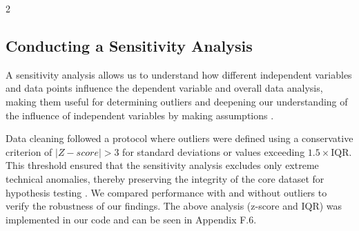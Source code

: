 \documentclass[a4paper,12pt]{article}
\begin{document}
\begin{multicols}{2}

\subsection{Conducting a Sensitivity Analysis} \label{analysis}

A sensitivity analysis allows us to understand how different independent variables and data points influence the dependent variable and overall data analysis, making them useful for determining outliers and deepening our understanding of the influence of independent variables by making assumptions \cite{sensitive}. 

Data cleaning followed a protocol where outliers were defined using a conservative criterion of $|Z-score| > 3$ for standard deviations or values exceeding $1.5 \times \text{IQR}$. This threshold ensured that the sensitivity analysis excludes only extreme technical anomalies, thereby preserving the integrity of the core dataset for hypothesis testing \cite{frost2019five}. We compared performance with and without outliers to verify the robustness of our findings. The above analysis (z-score and IQR) was implemented in our code and can be seen in Appendix F.6. 


\end{multicols}
\end{document}
